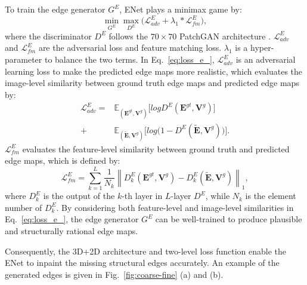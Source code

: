 To train the edge generator $G^E$, ENet plays a minimax game by:
\begin{equation}
	\label{eq:loss_e_}
	\min\limits_{G^E} \max \limits_{D^E} \big(\mathcal{L}^E_{adv}+\lambda_1 * \mathcal{L}^E_{fm}\big),
\end{equation}
where the discriminator $D^E$ follows the $70\times 70$ PatchGAN architecture \cite{Isola_2017_CVPR}. 
$\mathcal{L}^E_{adv}$ and $\mathcal{L}^E_{fm}$ are the adversarial loss and feature matching loss. 
$\lambda_1$ is a hyper-parameter to balance the two terms.
%
In Eq.~\eqref{eq:loss_e_}, $\mathcal{L}^E_{adv}$ is an adversarial learning loss to make the predicted edge maps more realistic, which evaluates the image-level similarity between ground truth edge maps and predicted edge maps by:
\begin{equation} \label{eq:edge_adver}
	\begin{aligned} 
		\mathcal{L}^E_{adv}  =&\mathbb{E}_{(\boldsymbol{E}^{gt},\boldsymbol{V}^{g})}\big[logD^E(\boldsymbol{E}^{gt},\boldsymbol{V}^{g})\big]\\ 
		+&\mathbb{E}_{(\boldsymbol{\widetilde{E}},\boldsymbol{V}^{g})}\big[log\big(1-D^E ( \boldsymbol{\widetilde{E}},\boldsymbol{V}^{g})\big)\big].
	\end{aligned}
\end{equation}
$\mathcal{L}^E_{fm}$ evaluates the feature-level similarity between ground truth and predicted edge maps, which is defined by:
\begin{equation}
	\label{eq:edge_fm}
	\mathcal{L}^E_{fm}=\sum_{k=1}^L{\frac{1}{N_k}\left\| D^E_k(\boldsymbol{E}^{gt},\boldsymbol{V}^{g})- D^E_k(\boldsymbol{\widetilde{E}},\boldsymbol{V}^{g})\right\|_1},
\end{equation}
where $D^E_k$ is the output of the $k$-th layer in $L$-layer $D^E$, while $N_k$ is the element number of $D^E_k$.
By considering both feature-level and image-level similarities in Eq.~\eqref{eq:loss_e_}, the edge generator $G^E$ can be well-trained to produce plausible and structurally rational edge maps.

Consequently, the 3D+2D architecture and two-level loss function enable the ENet to inpaint the missing structural edges accurately.
An example of the generated edges is given in Fig.~\ref{fig:coarse-fine} (a) and (b).






